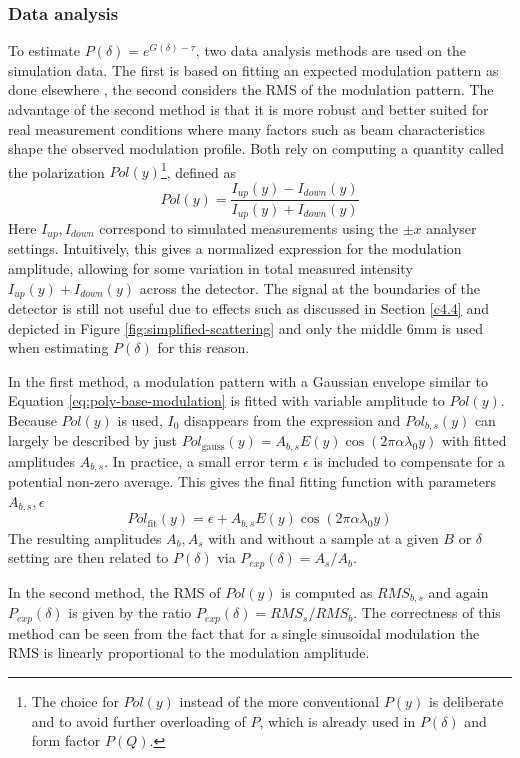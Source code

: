 \documentclass{article}
\begin{document}
\subsubsection{Data analysis}
To estimate $P(\delta) = e^{G(\delta)  - \tau}$, two data analysis methods are used on the simulation data. The first is based on fitting an expected modulation pattern as done elsewhere \cite{bouwman2011}\cite{parnell2023}, the second considers the RMS of the modulation pattern. The advantage of the second method is that it is more robust and better suited for real measurement conditions where many factors such as beam characteristics shape the observed modulation profile. Both rely on computing a quantity called the polarization $Pol(y)$\footnote{The choice for $Pol(y)$ instead of the more conventional $P(y)$ is deliberate and to avoid further overloading of $P$, which is already used in $P(\delta)$ and form factor $P(Q)$.}, defined as 
$$Pol(y) = \frac{I_{up}(y) - I_{down}(y)}{I_{up}(y) + I_{down}(y)}$$
Here $I_{up}, I_{down}$ correspond to simulated measurements using the $\pm x$ analyser settings. Intuitively, this gives a normalized expression for the modulation amplitude, allowing for some variation in total measured intensity $I_{up}(y) + I_{down}(y)$ across the detector. The signal at the boundaries of the detector is still not useful due to effects such as discussed in Section \ref{c4.4} and depicted in Figure \ref{fig:simplified-scattering} and only the middle $6\unit{\milli\meter}$ is used when estimating $P(\delta)$ for this reason.

In the first method, a modulation pattern with a Gaussian envelope similar to Equation \eqref{eq:poly-base-modulation} is fitted with variable amplitude to $Pol(y)$. Because $Pol(y)$ is used, $I_0$ disappears from the expression and $Pol_{b,s}(y)$ can largely be described by just $Pol_{\text{gauss}}(y) = A_{b,s}E(y)\cos(2\pi\alpha\lambda_0y)$ with fitted amplitudes $A_{b,s}$. In practice, a small error term $\epsilon$ is included to compensate for a potential non-zero average. This gives the final fitting function with parameters $A_{b,s}, \epsilon$
\begin{equation}
	Pol_{\text{fit}}(y) = \epsilon+ A_{b,s}E(y)\cos(2\pi\alpha\lambda_0y) \label{eq:gauss-fit-function}
\end{equation}
The resulting amplitudes $A_b, A_s$ with and without a sample at a given $B$ or $\delta$ setting are then related to $P(\delta)$ via $P_{exp}(\delta) = A_s/A_b$. 

In the second method, the RMS of $Pol(y)$ is computed as $RMS_{b,s}$ and again $P_{exp}(\delta)$ is given by the ratio $P_{exp}(\delta) = RMS_s/RMS_b$. The correctness of this method can be seen from the fact that for a single sinusoidal modulation the RMS is linearly proportional to the modulation amplitude. 
\end{document}
